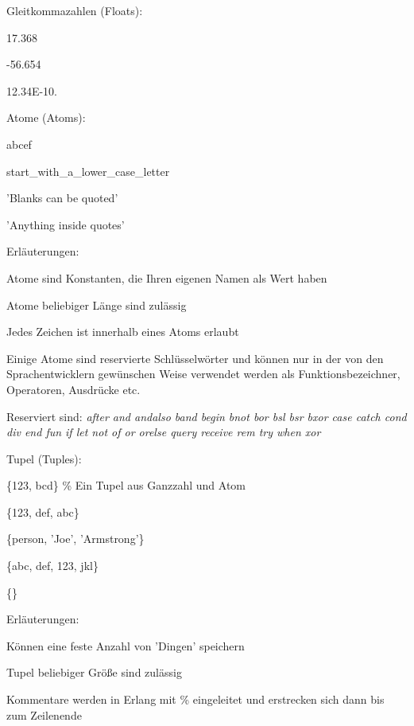 \documentclass[10pt]{article}
\begin{document}
Gleitkommazahlen (Floats):
\begin{itemize*}
  \item 17.368
  \item -56.654
  \item 12.34E-10.
\end{itemize*}

Atome (Atoms):
\begin{itemize*}
  \item abcef
  \item start\_with\_a\_lower\_case\_letter
  \item 'Blanks can be quoted'
  \item 'Anything inside quotes'
  \item Erläuterungen:
  \begin{itemize*}
    \item Atome sind Konstanten, die Ihren eigenen Namen als Wert haben
    \item Atome beliebiger Länge sind zulässig
    \item Jedes Zeichen ist innerhalb eines Atoms erlaubt
    \item Einige Atome sind reservierte Schlüsselwörter und können nur in der von den Sprachentwicklern gewünschen Weise verwendet werden als Funktionsbezeichner, Operatoren, Ausdrücke etc.
    \item Reserviert sind: \textit{after and andalso band begin bnot bor bsl bsr bxor case catch cond div end fun if let not of or orelse query receive rem try when xor}
  \end{itemize*}
\end{itemize*}

Tupel (Tuples):
\begin{itemize*}
  \item \{123, bcd\} \% Ein Tupel aus Ganzzahl und Atom
  \item \{123, def, abc\}
  \item \{person, 'Joe', 'Armstrong'\}
  \item \{abc, {def, 123}, jkl\}
  \item \{\}
  \item Erläuterungen:
  \begin{itemize*}
    \item Können eine feste Anzahl von 'Dingen' speichern
    \item Tupel beliebiger Größe sind zulässig
    \item Kommentare werden in Erlang mit \% eingeleitet und erstrecken sich dann bis zum Zeilenende
  \end{itemize*}
\end{itemize*}
\end{document}
